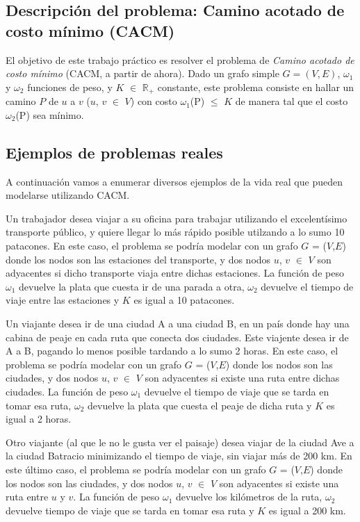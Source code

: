 \subsection{Descripción del problema: Camino acotado de costo mínimo (CACM)}
\label{sub:introduccion-descripcion}

El objetivo de este trabajo práctico es resolver el problema de \emph{Camino acotado de costo mínimo} (CACM, a partir de ahora). Dado un grafo simple $G = (V,E)$, $\omega_1$ y $\omega_2$ funciones de peso, y $K$ $\in$ $\mathbb{R}_+$ constante, este problema consiste en hallar un camino $P$ de $u$ a $v$ ($u$, $v$ $\in$ $V$) con costo $\omega_1$(P) $\leq$ $K$ de manera tal que el costo $\omega_2$(P) sea mínimo.

\subsection{Ejemplos de problemas reales}
\label{sub:introduccion-ejemplos}

A continuación vamos a enumerar diversos ejemplos de la vida real que pueden modelarse utilizando CACM.

Un trabajador desea viajar a su oficina para trabajar utilizando el excelentísimo transporte público, y quiere llegar lo más rápido posible utilzando a lo sumo 10 patacones. En este caso, el problema se podría modelar con un grafo $G$ = ($V$,$E$) donde los nodos son las estaciones del transporte, y dos nodos $u$, $v$ $\in$ $V$ son adyacentes si dicho transporte viaja entre dichas estaciones. La función de peso $\omega_1$ devuelve la plata que cuesta ir de una parada a otra, $\omega_2$ devuelve el tiempo de viaje entre las estaciones y $K$ es igual a 10 patacones.

Un viajante desea ir de una ciudad A a una ciudad B, en un país donde hay una cabina de peaje en cada ruta que conecta dos ciudades. Este viajente desea ir de A a B, pagando lo menos posible tardando a lo sumo 2 horas. En este caso, el problema se podría modelar con un grafo $G$ = ($V$,$E$) donde los nodos son las ciudades, y dos nodos $u$, $v$ $\in$ $V$ son adyacentes si existe una ruta entre dichas ciudades. La función de peso $\omega_1$ devuelve el tiempo de viaje que se tarda en tomar esa ruta, $\omega_2$ devuelve la plata que cuesta el peaje de dicha ruta y $K$ es igual a 2 horas.

Otro viajante (al que le no le gusta ver el paisaje) desea viajar de la ciudad Ave a la ciudad Batracio minimizando el tiempo de viaje, sin viajar más de 200 km. En este último caso, el problema se podría modelar con un grafo $G$ = ($V$,$E$) donde los nodos son las ciudades, y dos nodos $u$, $v$ $\in$ $V$ son adyacentes si existe una ruta entre $u$ y $v$. La función de peso $\omega_1$ devuelve los kilómetros de la ruta, $\omega_2$ devuelve tiempo de viaje que se tarda en tomar esa ruta y $K$ es igual a 200 km.

